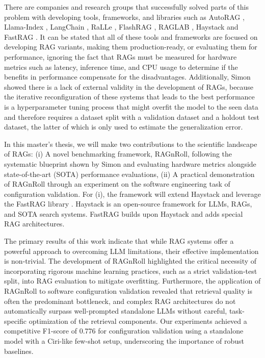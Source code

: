 There are companies and research groups that successfully solved parts of this problem with developing tools, frameworks, and libraries such as AutoRAG \cite{AutoRAG}, Llama-Index \cite{Liu_LlamaIndex_2022}, LangChain \cite{Chase_LangChain_2022}, RaLLe \cite{ralle}, FlashRAG \cite{FlashRAG}, RAGLAB \cite{zhang-etal-2024-raglab}, Haystack \cite{Pietsch_Haystack_the_end-to-end_2019} and FastRAG \cite{Izsak_fastRAG_Efficient_Retrieval_2023}. It can be stated that all of these tools and frameworks are focused on developing RAG variants, making them production-ready, or evaluating them for performance, ignoring the fact that RAGs must be measured for hardware metrics such as latency, inference time, and CPU usage to determine if the benefits in performance compensate for the disadvantages. Additionally, Simon \cite{Simon.10112024} showed there is a lack of external validity in the development of RAGs, because the iterative reconfiguration of these systems that leads to the best performance is a hyperparameter tuning process that might overfit the model to the seen data and therefore requires a dataset split with a validation dataset and a holdout test dataset, the latter of which is only used to estimate the generalization error.

In this master's thesis, we will make two contributions to the scientific landscape of RAGs: (i) A novel benchmarking framework, RAGnRoll, following the systematic blueprint shown by Simon \cite{Simon.10112024} and evaluating hardware metrics alongside state-of-the-art (SOTA) performance evaluations, (ii) A practical demonstration of RAGnRoll through an experiment on the software engineering task of configuration validation. For (i), the framework will extend Haystack \cite{Pietsch_Haystack_the_end-to-end_2019} and leverage the FastRAG library \cite{Izsak_fastRAG_Efficient_Retrieval_2023}. Haystack is an open-source framework for LLMs, RAGs, and SOTA search systems. FastRAG builds upon Haystack and adds special RAG architectures. 

The primary results of this work indicate that while RAG systems offer a powerful approach to overcoming LLM limitations, their effective implementation is non-trivial. The development of RAGnRoll highlighted the critical necessity of incorporating rigorous machine learning practices, such as a strict validation-test split, into RAG evaluation to mitigate overfitting. Furthermore, the application of RAGnRoll to software configuration validation revealed that retrieval quality is often the predominant bottleneck, and complex RAG architectures do not automatically surpass well-prompted standalone LLMs without careful, task-specific optimization of the retrieval components. Our experiments achieved a competitive F1-score of 0.776 for configuration validation using a standalone model with a Ciri-like few-shot setup, underscoring the importance of robust baselines.

